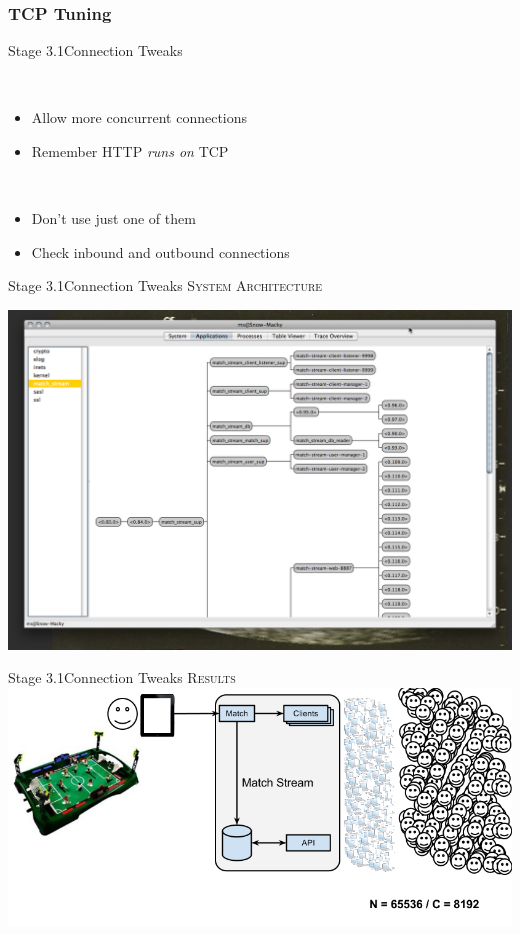 \documentclass[utf8]{beamer}
\begin{document}
\subsubsection{TCP Tuning}
\begin{frame}{Stage 3.1}{Connection Tweaks}
	\begin{description}
		\item<+->[Backlog]\ \\
			\begin{itemize}
				\item Allow more concurrent connections
				\item Remember HTTP \emph{runs on} TCP
			\end{itemize}
		\item<+->[Connections]\ \\
			\begin{itemize}
				\item Don't use just one of them
				\item Check inbound and outbound connections
			\end{itemize}
	\end{description}
\end{frame}
\begin{frame}{Stage 3.1}{Connection Tweaks}
	\textsc{System Architecture}
	\begin{center}
		\includegraphics[height=.75\textheight]{img/running-late.png}
	\end{center}
\end{frame}
\begin{frame}{Stage 3.1}{Connection Tweaks}
	\textsc{Results}
	\includegraphics[top=-1,width=\textwidth]{img/MatchStream-3.png}
\end{frame}
\end{document}
